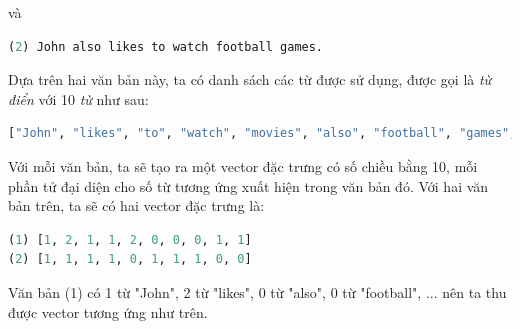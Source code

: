 và  
 
\begin{lstlisting}[language=Python]
(2) John also likes to watch football games. 
\end{lstlisting}
Dựa trên hai văn bản này, ta có danh sách các từ được sử dụng, được gọi là \textit{từ điển} với 10 \textit{từ} như sau: 
 
\begin{lstlisting}[language=Python]
["John", "likes", "to", "watch", "movies", "also", "football", "games", "Mary", "too"] 
\end{lstlisting}
Với mỗi văn bản, ta sẽ tạo ra một vector đặc trưng có số chiều bằng 10, mỗi phần tử đại diện cho số từ tương ứng xuất hiện trong văn bản đó. Với hai văn bản trên, ta sẽ có hai vector đặc trưng là: 
 
\begin{lstlisting}[language=Python]
(1) [1, 2, 1, 1, 2, 0, 0, 0, 1, 1] 
(2) [1, 1, 1, 1, 0, 1, 1, 1, 0, 0] 
\end{lstlisting}
Văn bản (1) có 1 từ "John", 2 từ "likes", 0 từ "also", 0 từ "football", ... nên ta thu được vector tương ứng như trên.  
 

